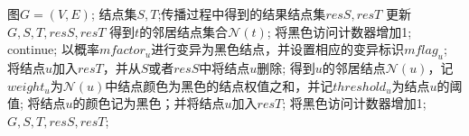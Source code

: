 \begin{algorithm}[H]
	\caption{$XLT4C-BLACK-Update(G, S, T, resS, resT)$}
	\label{alg:chap4:inf-spread-black}
	\begin{algorithmic}[1]
	\REQUIRE 图$G=(V,E)$; 结点集$S,T$;传播过程中得到的结果结点集$resS, resT$
	\ENSURE 更新$G, S, T, resS, resT$
			\STATE 得到$t$的邻居结点集合$\mathcal{N}(t)$;
					\STATE 将黑色访问计数器增加1;
					\STATE continue;
					\STATE 以概率$mfactor_{u}$进行变异为黑色结点，并设置相应的变异标识$mflag_{u}$;
					\STATE 将结点$u$加入$resT$，并从$S$或者$resS$中将结点$u$删除;
				\ELSE
					\STATE 得到$u$的邻居结点$\mathcal{N}(u)$，记$weight_{u}$为$\mathcal{N}(u)$中结点颜色为黑色的结点权值之和，并记$threshold_{u}$为结点$u$的阈值;
						\STATE 将结点$u$的颜色记为黑色；并将结点$u$加入$resT$;
					\ENDIF
				\ENDIF
				\STATE 将黑色访问计数器增加1;
			\ENDFOR
		\ENDFOR
		\RETURN $G, S, T, resS, resT$;
	\end{algorithmic}
\end{algorithm}


